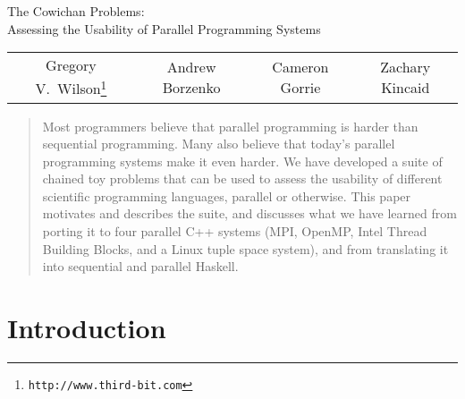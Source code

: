 



\begin{Large}\begin{center}
The Cowichan Problems: \\
Assessing the Usability of Parallel Programming Systems
\end{center}\end{Large}

\vspace{\baselineskip}

\begin{center}
\begin{tabular}{cccc}
Gregory V.~Wilson\footnote{\verb`http://www.third-bit.com`}
&
Andrew Borzenko
&
Cameron Gorrie
&
Zachary Kincaid
\end{tabular}
\end{center}

\vspace{\baselineskip}

\begin{abstract}
Most programmers believe that parallel programming is harder than sequential programming.
Many also believe that today's parallel programming systems make it even harder.
We have developed a suite of chained toy problems that can be used to assess
the usability of different scientific programming languages, parallel or otherwise.
This paper motivates and describes the suite,
and discusses what we have learned from porting it to four parallel C++ systems
(MPI, OpenMP, Intel Thread Building Blocks, and a Linux tuple space system),
and from translating it into sequential and parallel Haskell.
\end{abstract}

\section{Introduction\label{s:intro}}

